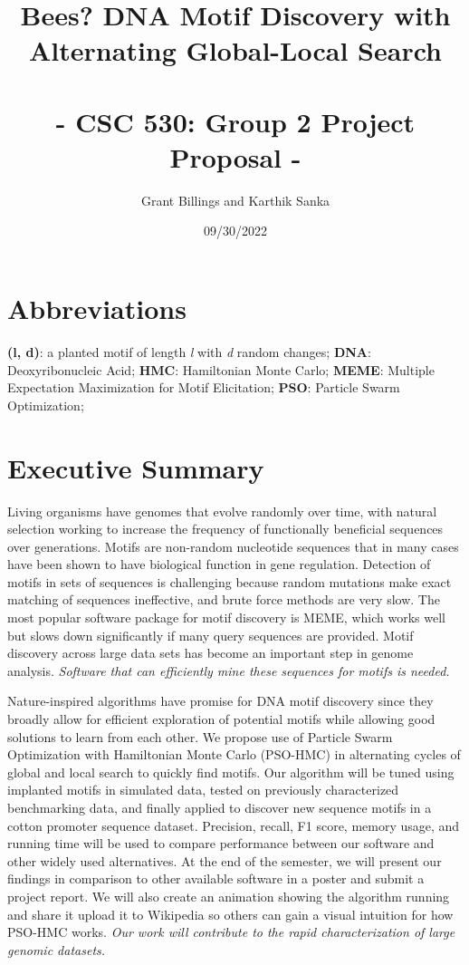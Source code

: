 \documentclass{article}
\title{%
	\Large Bees? DNA Motif Discovery with Alternating Global-Local Search  \\
	\large \; \\ - CSC 530: Group 2 Project Proposal -}
\author{Grant Billings and Karthik Sanka}
\date{09/30/2022}
\begin{document}
\maketitle
\section*{\large{Abbreviations}}
\textbf{(l, d)}: a planted motif of length \textit{l} with \textit{d} random changes; \textbf{DNA}: Deoxyribonucleic Acid; \textbf{HMC}: Hamiltonian Monte Carlo; \textbf{MEME}: Multiple Expectation Maximization for Motif Elicitation; \textbf{PSO}: Particle Swarm Optimization;
\section{Executive Summary}
Living organisms have genomes that evolve randomly over time, with natural selection working to increase the frequency of functionally beneficial sequences over generations. Motifs are non-random nucleotide sequences that in many cases have been shown to have biological function in gene regulation. Detection of motifs in sets of sequences is challenging because random mutations make exact matching of sequences ineffective, and brute force methods are very slow. The most popular software package for motif discovery is MEME, which works well but slows down significantly if many query sequences are provided. Motif discovery across large data sets has become an important step in genome analysis. \textit{Software that can efficiently mine these sequences for motifs is needed.}  
  
Nature-inspired algorithms have promise for DNA motif discovery since they broadly allow for efficient exploration of potential motifs while allowing good solutions to learn from each other. We propose use of Particle Swarm Optimization with Hamiltonian Monte Carlo (PSO-HMC) in alternating cycles of global and local search to quickly find motifs. Our algorithm will be tuned using implanted motifs in simulated data, tested on previously characterized benchmarking data, and finally applied to discover new sequence motifs in a cotton promoter sequence dataset. Precision, recall, F1 score, memory usage, and running time will be used to compare performance between our software and other widely used alternatives. At the end of the semester, we will present our findings in comparison to other available software in a poster and submit a project report. We will also create an animation showing the algorithm running and share it upload it to Wikipedia so others can gain a visual intuition for how PSO-HMC works. \textit{Our work will contribute to the rapid characterization of large genomic datasets.}
\end{document}
